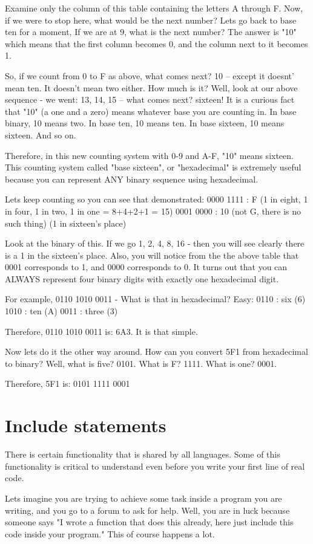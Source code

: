 \documentclass[a4paper,12pt]{article}
\let\stdsection\section
\renewcommand\section{\newpage\stdsection}
\begin{document}
Examine only the column of this table containing the letters A through F. Now, if we were to stop here, what would be the next number? Lets go back to base ten for a moment, If we are at 9, what is the next number? The answer is "10" which means that the first column becomes 0, and the column next to it becomes 1.

So, if we count from 0 to F as above, what comes next? 10 -- except it doesnt' mean ten. It doesn't mean two either. How much is it? Well, look at our above sequence - we went: 13, 14, 15 -- what comes next? sixteen! It is a curious fact that "10" (a one and a zero) means whatever base you are counting in. In base binary, 10 means two. In base ten, 10 means ten. In base sixteen, 10 means sixteen. And so on.

Therefore, in this new counting system with 0-9 and A-F, "10" means sixteen. This counting system called "base sixteen", or "hexadecimal" is extremely useful because you can represent ANY binary sequence using hexadecimal.

Lets keep counting so you can see that demonstrated:
0000 1111 : F (1 in eight, 1 in four, 1 in two, 1 in one = 8+4+2+1 = 15)
0001 0000 : 10 (not G, there is no such thing) (1 in sixteen's place)

Look at the binary of this. If we go 1, 2, 4, 8, 16 - then you will see clearly there is a 1 in the sixteen's place. Also, you will notice from the the above table that 0001 corresponds to 1, and 0000 corresponds to 0. It turns out that you can ALWAYS represent four binary digits with exactly one hexadecimal digit.

For example, 0110 1010 0011 - What is that in hexadecimal? Easy:
0110 : six (6)
1010 : ten (A)
0011 : three (3)

Therefore, 0110 1010 0011 is: 6A3. It is that simple.

Now lets do it the other way around. How can you convert 5F1 from hexadecimal to binary? Well, what is five? 0101. What is F? 1111. What is one? 0001.

Therefore, 5F1 is: 0101 1111 0001
\section{Include statements}
There is certain functionality that is shared by all languages. Some of this functionality is critical to understand even before you write your first line of real code.

Lets imagine you are trying to achieve some task inside a program you are writing, and you go to a forum to ask for help. Well, you are in luck because someone says "I wrote a function that does this already, here just include this code inside your program." This of course happens a lot.
\end{document}
